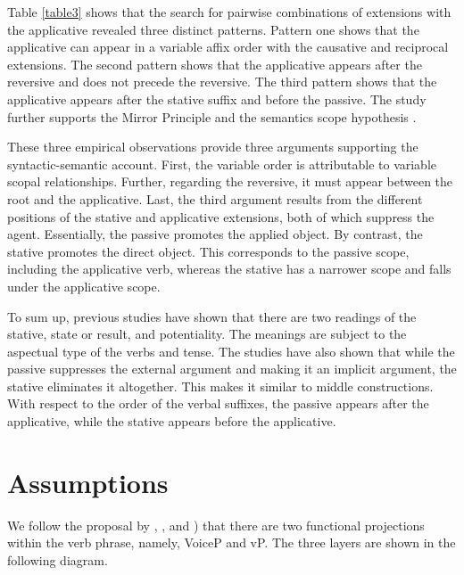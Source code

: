 \documentclass[output=paper]{langscibook}
\begin{document}
Table \ref{table3} shows that the search for pairwise combinations of extensions with the applicative revealed three distinct patterns. Pattern one shows that the applicative can appear in a variable affix order with the causative and reciprocal extensions. The second pattern shows that the applicative appears after the reversive and does not precede the reversive. The third pattern shows  that the applicative appears after the stative suffix and before the passive. The study further supports the Mirror Principle \citep{Baker1985} and the semantics scope hypothesis \citep{rice2000}. 

These three empirical observations provide three arguments supporting the syntactic-semantic account. First, the variable order is attributable to variable scopal relationships. Further, regarding the reversive, it must appear between the root and the applicative. Last, the third argument results from the different positions of the stative and applicative extensions, both of which suppress the agent. Essentially, the passive promotes the applied object. By contrast, the stative promotes the direct object. This corresponds to the passive scope, including the applicative verb, whereas the stative has a narrower scope and falls under the applicative scope. 

To sum up, previous studies have shown that there are two readings of the stative, state or result, and potentiality. The meanings are subject to the aspectual type of the verbs and tense. The studies have also shown that while the passive suppresses the external argument and making it an implicit argument, the stative eliminates it altogether. This makes it similar to middle constructions. With respect to the order of the verbal suffixes, the passive appears after the applicative, while the stative appears before the applicative.  

\section{Assumptions}
We follow the proposal by \citet{Folli:2007aa}, \citet{legate14}, and \citet{pylkkanen08}) that there are two functional projections within the verb phrase, namely, VoiceP and vP. The three layers are shown in the following diagram.

\begin{exe}
\ex\label{rmtree}{ 
}
\end{exe}
\end{document}
